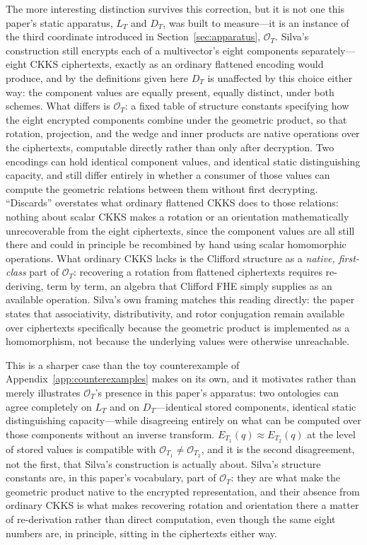 \documentclass[11pt]{article}
\theoremstyle{plain}
\begin{document}
The more interesting distinction survives this correction, but it is not one this paper's static apparatus, $L_T$ and $D_T$, was built to measure---it is an instance of the third coordinate introduced in Section~\ref{sec:apparatus}, $\mathcal{O}_T$. Silva's construction still encrypts each of a multivector's eight components separately---eight CKKS ciphertexts, exactly as an ordinary flattened encoding would produce, and by the definitions given here $D_T$ is unaffected by this choice either way: the component values are equally present, equally distinct, under both schemes. What differs is $\mathcal{O}_T$: a fixed table of structure constants specifying how the eight encrypted components combine under the geometric product, so that rotation, projection, and the wedge and inner products are native operations over the ciphertexts, computable directly rather than only after decryption. Two encodings can hold identical component values, and identical static distinguishing capacity, and still differ entirely in whether a consumer of those values can compute the geometric relations between them without first decrypting. ``Discards'' overstates what ordinary flattened CKKS does to those relations: nothing about scalar CKKS makes a rotation or an orientation mathematically unrecoverable from the eight ciphertexts, since the component values are all still there and could in principle be recombined by hand using scalar homomorphic operations. What ordinary CKKS lacks is the Clifford structure as a \emph{native, first-class} part of $\mathcal{O}_T$: recovering a rotation from flattened ciphertexts requires re-deriving, term by term, an algebra that Clifford FHE simply supplies as an available operation. Silva's own framing matches this reading directly: the paper states that associativity, distributivity, and rotor conjugation remain available over ciphertexts specifically because the geometric product is implemented as a homomorphism, not because the underlying values were otherwise unreachable.

This is a sharper case than the toy counterexample of Appendix~\ref{app:counterexamples} makes on its own, and it motivates rather than merely illustrates $\mathcal{O}_T$'s presence in this paper's apparatus: two ontologies can agree completely on $L_T$ and on $D_T$---identical stored components, identical static distinguishing capacity---while disagreeing entirely on what can be computed over those components without an inverse transform. $E_{T_1}(q) \approx E_{T_2}(q)$ at the level of stored values is compatible with $\mathcal{O}_{T_1} \ne \mathcal{O}_{T_2}$, and it is the second disagreement, not the first, that Silva's construction is actually about. Silva's structure constants are, in this paper's vocabulary, part of $\mathcal{O}_T$: they are what make the geometric product native to the encrypted representation, and their absence from ordinary CKKS is what makes recovering rotation and orientation there a matter of re-derivation rather than direct computation, even though the same eight numbers are, in principle, sitting in the ciphertexts either way.
\end{document}
